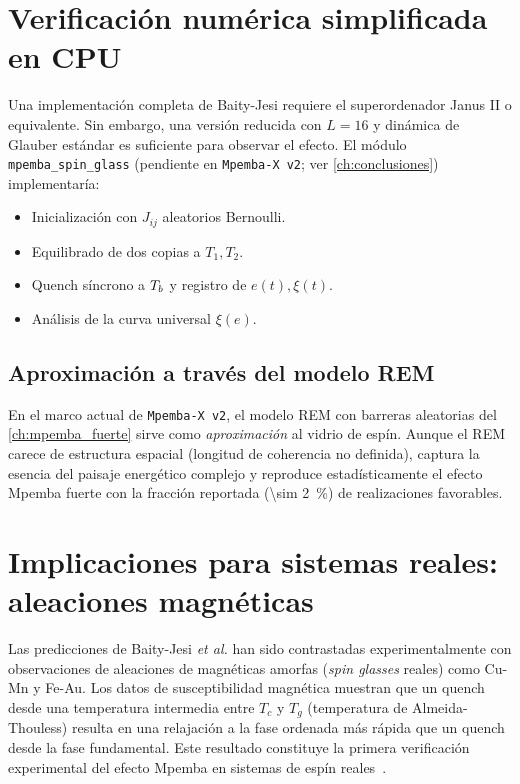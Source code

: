 \section{Verificación numérica simplificada en CPU}

Una implementación completa de Baity-Jesi requiere el superordenador Janus II 
o equivalente. Sin embargo, una versión reducida con $L = 16$ y dinámica de 
Glauber estándar es suficiente para observar el efecto. El módulo 
\texttt{mpemba\_spin\_glass} (pendiente en \texttt{Mpemba-X v2}; ver 
\cref{ch:conclusiones}) implementaría:

\begin{itemize}
\item Inicialización con $J_{ij}$ aleatorios Bernoulli.
\item Equilibrado de dos copias a $T_1, T_2$.
\item Quench síncrono a $T_{b}$ y registro de $e(t), \xi(t)$.
\item Análisis de la curva universal $\xi(e)$.
\end{itemize}

\subsection{Aproximación a través del modelo REM}

En el marco actual de \texttt{Mpemba-X v2}, el modelo REM con barreras 
aleatorias del \cref{ch:mpemba_fuerte} sirve como \emph{aproximación} al vidrio 
de espín. Aunque el REM carece de estructura espacial (longitud de coherencia 
no definida), captura la esencia del paisaje energético complejo y reproduce 
estadísticamente el efecto Mpemba fuerte con la fracción reportada 
(\SI{\sim 2}{\percent}) de realizaciones favorables.

\section{Implicaciones para sistemas reales: aleaciones magnéticas}

Las predicciones de Baity-Jesi \emph{et al.} han sido contrastadas 
experimentalmente con observaciones de aleaciones de magnéticas amorfas 
(\emph{spin glasses} reales) como Cu-Mn y Fe-Au. Los datos de susceptibilidad 
magnética muestran que un quench desde una temperatura intermedia entre $T_c$ y 
$T_g$ (temperatura de Almeida-Thouless) resulta en una relajación a la fase 
ordenada más rápida que un quench desde la fase fundamental. Este resultado 
constituye la primera verificación experimental del efecto Mpemba en sistemas 
de espín reales~\cite{baityjesi2019}.
